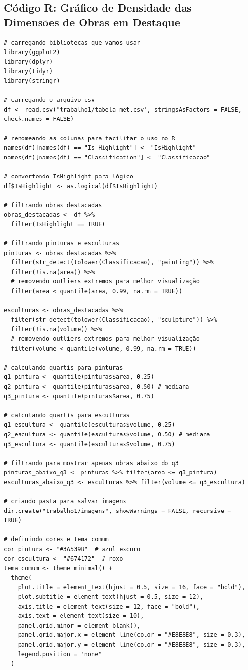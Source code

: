 \documentclass[11pt,a4paper]{article}
\begin{document}
\subsection*{Código R: Gráfico de Densidade das Dimensões de Obras em Destaque}
\label{anx:codigo_histograma_dimensoes_highlight}
\begin{verbatim}
# carregando bibliotecas que vamos usar
library(ggplot2)
library(dplyr)
library(tidyr)
library(stringr)

# carregando o arquivo csv
df <- read.csv("trabalho1/tabela_met.csv", stringsAsFactors = FALSE, check.names = FALSE)

# renomeando as colunas para facilitar o uso no R
names(df)[names(df) == "Is Highlight"] <- "IsHighlight"
names(df)[names(df) == "Classification"] <- "Classificacao"

# convertendo IsHighlight para lógico
df$IsHighlight <- as.logical(df$IsHighlight)

# filtrando obras destacadas
obras_destacadas <- df %>%
  filter(IsHighlight == TRUE)

# filtrando pinturas e esculturas
pinturas <- obras_destacadas %>%
  filter(str_detect(tolower(Classificacao), "painting")) %>%
  filter(!is.na(area)) %>%
  # removendo outliers extremos para melhor visualização
  filter(area < quantile(area, 0.99, na.rm = TRUE))

esculturas <- obras_destacadas %>%
  filter(str_detect(tolower(Classificacao), "sculpture")) %>%
  filter(!is.na(volume)) %>%
  # removendo outliers extremos para melhor visualização
  filter(volume < quantile(volume, 0.99, na.rm = TRUE))

# calculando quartis para pinturas
q1_pintura <- quantile(pinturas$area, 0.25)
q2_pintura <- quantile(pinturas$area, 0.50) # mediana
q3_pintura <- quantile(pinturas$area, 0.75)

# calculando quartis para esculturas
q1_escultura <- quantile(esculturas$volume, 0.25)
q2_escultura <- quantile(esculturas$volume, 0.50) # mediana
q3_escultura <- quantile(esculturas$volume, 0.75)

# filtrando para mostrar apenas obras abaixo do q3
pinturas_abaixo_q3 <- pinturas %>% filter(area <= q3_pintura)
esculturas_abaixo_q3 <- esculturas %>% filter(volume <= q3_escultura)

# criando pasta para salvar imagens
dir.create("trabalho1/imagens", showWarnings = FALSE, recursive = TRUE)

# definindo cores e tema comum
cor_pintura <- "#3A539B"  # azul escuro
cor_escultura <- "#674172"  # roxo
tema_comum <- theme_minimal() +
  theme(
    plot.title = element_text(hjust = 0.5, size = 16, face = "bold"),
    plot.subtitle = element_text(hjust = 0.5, size = 12),
    axis.title = element_text(size = 12, face = "bold"),
    axis.text = element_text(size = 10),
    panel.grid.minor = element_blank(),
    panel.grid.major.x = element_line(color = "#E8E8E8", size = 0.3),
    panel.grid.major.y = element_line(color = "#E8E8E8", size = 0.3),
    legend.position = "none"
  )


\end{verbatim}
\end{document}

